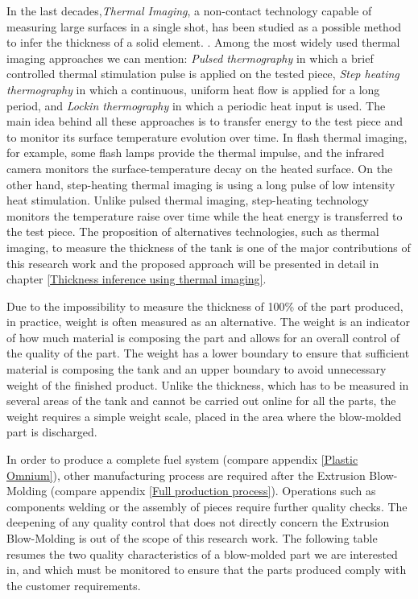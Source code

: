 In the last decades,\textit{Thermal Imaging}, a non-contact technology capable of measuring large surfaces in a single shot, has been studied as a possible method to infer the thickness of a solid element. \citep{sun2003method,sun2006analysis,choi2008quantitative,benitez2008definition,zeng2012absolute,li2018thickness,he2013eddy}. Among the most widely used thermal imaging approaches we can mention: \textit{Pulsed thermography} in which a brief controlled thermal stimulation pulse is applied on the tested piece, \textit{Step heating thermography} in which a continuous, uniform heat flow is applied for a long period, and \textit{Lockin thermography} in which a periodic heat input is used. The main idea behind all these approaches is to transfer energy to the test piece and to monitor its surface temperature evolution over time. In flash thermal imaging, for example, some flash lamps provide the thermal impulse, and the infrared camera monitors the surface-temperature decay on the heated surface. On the other hand, step-heating thermal imaging is using a long pulse of low intensity heat stimulation. Unlike pulsed thermal imaging, step-heating technology monitors the temperature raise over time while the heat energy is transferred to the test piece. The proposition of alternatives technologies, such as thermal imaging, to measure the thickness of the tank is one of the major contributions of this research work and the proposed approach will be presented in detail in chapter \ref{Thickness inference using thermal imaging}.

Due to the impossibility to measure the thickness of 100\% of the part produced, in practice, weight is often measured as an alternative. The weight is an indicator of how much material is composing the part and allows for an overall control of the quality of the part. The weight has a lower boundary to ensure that sufficient material is composing the tank and an upper boundary to avoid unnecessary weight of the finished product. Unlike the thickness, which has to be measured in several areas of the tank and cannot be carried out online for all the parts, the weight requires a simple weight scale, placed in the area where the blow-molded part is discharged. 

In order to produce a complete fuel system (compare appendix \ref{Plastic Omnium}), other manufacturing process are required after the Extrusion Blow-Molding (compare appendix \ref{Full production process}). Operations such as components welding or the assembly of pieces require further quality checks. The deepening of any quality control that does not directly concern the Extrusion Blow-Molding is out of the scope of this research work. The following table resumes the two quality characteristics of a blow-molded part we are interested in, and which must be monitored to ensure that the parts produced comply with the customer requirements. 



